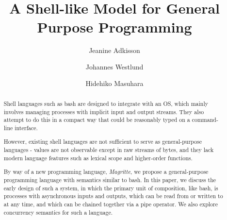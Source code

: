 \documentclass[format=sigconf, review=true, draft=true, screen=true]{acmart}
\title{A Shell-like Model for General Purpose Programming}
\author{Jeanine Adkisson}
\affiliation{\institution{Tokyo Institute of Technology}}
\author{Johannes Westlund}
\affiliation{\institution{TODO}}
\begin{document}
\author{Hidehiko Masuhara}



\begin{abstract}
Shell languages such as bash are designed to integrate with an OS, which mainly involves managing processes with implicit input and output streams. They also attempt to do this in a compact way that could be reasonably typed on a command-line interface.

However, existing shell languages are not sufficient to serve as general-purpose languages - values are not observable except in raw streams of bytes, and they lack modern language features such as lexical scope and higher-order functions.

By way of a new programming language, \emph{Magritte}, we propose a general-purpose programming language with semantics similar to bash. In this paper, we discuss the early design of such a system, in which the primary unit of composition, like bash, is processes with asynchronous inputs and outputs, which can be read from or written to at any time, and which can be chained together via a pipe operator. We also explore concurrency semantics for such a language.



\end{abstract}
\end{document}
